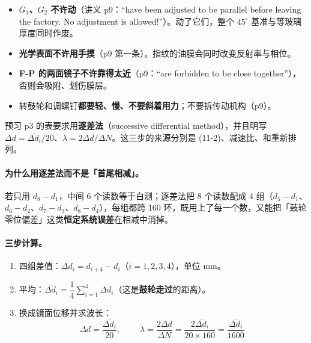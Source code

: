 \documentclass[11pt]{ctexart}
\begin{document}

\begin{itemize}
\item \textbf{\(G_1\)、\(G_2\) 不许动}（讲义 p9：``have been adjusted to be parallel before leaving the factory. No adjustment is allowed!''）。动了它们，整个 \(45^\circ\) 基准与等玻璃厚度同时作废。
\item \textbf{光学表面不许用手摸}（p9 第一条）。指纹的油膜会同时改变反射率与相位。
\item \textbf{F-P 的两面镜子不许靠得太近}（p9：``are forbidden to be close together''），否则会吸附、划伤膜层。
\item 转鼓轮和调螺钉\textbf{都要轻、慢、不要斜着用力}；不要拆传动机构（p9）。
\end{itemize}



预习 p3 的表要求用\textbf{逐差法}（successive differential method），并且明写 \(\Delta d=\overline{\Delta d_i}/20\)、\(\lambda=2\Delta d/\Delta N\)。这三步的来源分别是 (11-2)、减速比、和重新排列。

\paragraph{为什么用逐差法而不是「首尾相减」。}若只用 \(d_8-d_1\)，中间 6 个读数等于白测；逐差法把 8 个读数配成 4 组（\(d_5-d_1\)、\(d_6-d_2\)、\(d_7-d_3\)、\(d_8-d_4\)），每组都跨 160 环，既用上了每一个数，又能把「鼓轮零位偏差」这类\textbf{恒定系统误差}在相减中消掉。

\paragraph{三步计算。}
\begin{enumerate}
\item 四组差值：\(\Delta d_i=d_{i+4}-d_i\)（\(i=1,2,3,4\)），单位 mm。
\item 平均：\(\overline{\Delta d_i}=\dfrac{1}{4}\sum_{i=1}^{4}\Delta d_i\)（这是\textbf{鼓轮走过}的距离）。
\item 换成镜面位移并求波长：
\[
\Delta d=\frac{\overline{\Delta d_i}}{20},\qquad
\boxed{\;\lambda=\frac{2\Delta d}{\Delta N}=\frac{2\overline{\Delta d_i}}{20\times160}
=\frac{\overline{\Delta d_i}}{1600}\;}
\]
\end{enumerate}
\end{document}
